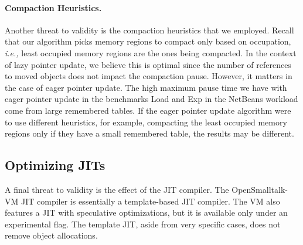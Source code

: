 \documentclass[sigplan,10pt,review,anonymous]{acmart}\settopmatter{printfolios=true,printccs=false,printacmref=false}
\newcommand{\todo}[1]{\color{orange}\fbox{\bfseries\sffamily\scriptsize TODO:}{\sf\small$\blacktriangleright$\textit{#1}$\blacktriangleleft$}\color{black}}
\def\OpenSmalltalkVM{OpenSmalltalk-VM\xspace}
\def\ie{\emph{i.e., }}
\begin{document}
%

\paragraph{Compaction Heuristics.} 
Another threat to validity is the compaction heuristics that we employed.
Recall that our algorithm picks memory regions to compact only based on occupation, \ie least occupied memory regions are the ones being compacted. In the context of lazy pointer update, we believe this is optimal since the number of references to moved objects does not impact the compaction pause. %
However, it matters in the case of eager pointer update. The high maximum pause time we have with eager pointer update in the benchmarks Load and Exp in the NetBeans workload come from large remembered tables. If the eager pointer update algorithm were to use different heuristics, for example, compacting the least occupied memory regions only if they have a small remembered table, the results may be different. 


\subsection{Optimizing JITs} 
\label{sec:optJITDisc}
A final threat to validity is the effect of the JIT compiler. The \OpenSmalltalkVM JIT compiler is essentially a template-based JIT compiler. The VM also features a JIT with speculative optimizations, but it is available only under an experimental flag. The template JIT, aside from very specific cases, does not remove object allocations. 
\end{document}
